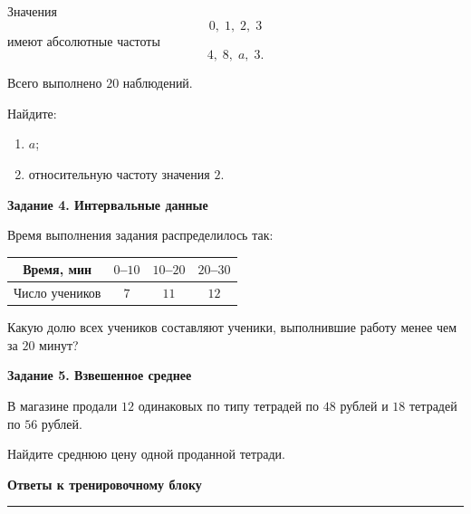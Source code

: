 \documentclass[a4paper,12pt]{article}
\newcommand{\sectiontitle}[1]{%
    \vspace{0.4em}
    {\Large\bfseries\color{darkaccent}#1\par}
    \vspace{0.25em}
    {\color{linegray}\rule{\linewidth}{0.6pt}}
    \vspace{0.7em}
}
\begin{document}
Значения
\[
0,\;1,\;2,\;3
\]
имеют абсолютные частоты
\[
4,\;8,\;a,\;3.
\]

Всего выполнено \(20\) наблюдений.

Найдите:

\begin{enumerate}[label=\alph*),leftmargin=9mm,itemsep=1pt]
    \item \(a\);
    \item относительную частоту значения \(2\).
\end{enumerate}

\vspace{5mm}

\textbf{Задание 4. Интервальные данные}

Время выполнения задания распределилось так:

\begin{center}
\begin{tabular}{cccc}
\toprule
Время, мин & \(0\)--\(10\) & \(10\)--\(20\) & \(20\)--\(30\) \\
\midrule
Число учеников & \(7\) & \(11\) & \(12\) \\
\bottomrule
\end{tabular}
\end{center}

Какую долю всех учеников составляют ученики, выполнившие работу менее чем за
\(20\) минут?

\vspace{5mm}

\textbf{Задание 5. Взвешенное среднее}

В магазине продали \(12\) одинаковых по типу тетрадей по \(48\) рублей и
\(18\) тетрадей по \(56\) рублей.

Найдите среднюю цену одной проданной тетради.


\clearpage

\sectiontitle{Ответы к тренировочному блоку}
\end{document}

